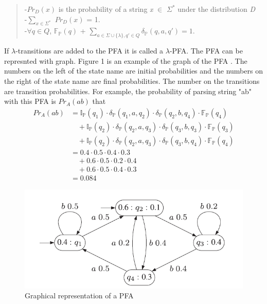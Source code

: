 \documentclass{article}
\theoremstyle{plain}
\theoremstyle{definition}
\theoremstyle{remark}
\begin{document}
\begin{quotation}
\noindent
-\textit{$Pr_D(x)$} is the probability of a string \textit{x} $\in$ $\Sigma^*$ under the distribution \textit{D} \\
-$\sum_{\textit{x}\in\Sigma^*}$ \textit{$Pr_D(x)$} = 1. \\
-$\forall q \in Q$, $\mathbb{F_P}(q)$ + $\sum_{a \in \Sigma\cup\{\lambda\}, q' \in Q}\delta_\mathbb{P}(q,a,q') = 1.$ \\
\end{quotation}
If $\lambda$-transitions are added to the PFA it is called a $\lambda$-PFA.
The PFA can be represnted with graph. Figure 1 is an example of the graph of the PFA \cite{de2010grammatical}. The numbers on the left of the state name are initial probabilities and the numbers on the right of the state name are final probabilities. The number on the 
transitions are transition probabilities. For example, the probability of parsing string "ab" with this PFA is  
\textit{$Pr_A(ab)$} that
\begin{align*}
Pr_A(ab)&= \mathbb{I_P}(q_1)\cdot\delta_\mathbb{P}(q_1,a,q_2)\cdot\delta_\mathbb{P}(q_2,b,q_4)\cdot\mathbb{F_P}(q_4)\nonumber\\
&\quad +\mathbb{I_P}(q_2)\cdot\delta_\mathbb{P}(q_2,a,q_3)\cdot\delta_\mathbb{P}(q_3,b,q_3)\cdot\mathbb{F_P}(q_3)\\
&\quad +\mathbb{I_P}(q_2)\cdot\delta_\mathbb{P}(q_2,a,q_3)\cdot\delta_\mathbb{P}(q_3,b,q_4)\cdot\mathbb{F_P}(q_4) \\
&= 0.4\cdot0.5\cdot0.4\cdot0.3\\
&\quad + 0.6\cdot0.5\cdot0.2\cdot0.4\\
&\quad + 0.6\cdot0.5\cdot0.4\cdot0.3 \\
&= 0.084
\end{align*}
\begin{figure}[htbp]
\begin{center}
\includegraphics[scale=0.7]{figure1}
\caption{Graphical representation of a PFA \cite{de2010grammatical}} \label{fig:label}
\end{center}
\end{figure}
\end{document}
